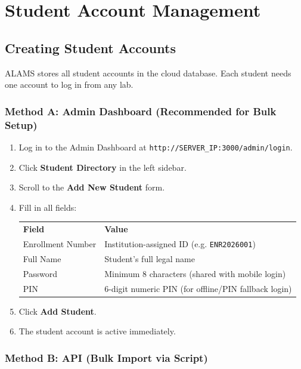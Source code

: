 \chapter{Student Account Management}
\label{ch:student-mgmt}

\section{Creating Student Accounts}

ALAMS stores all student accounts in the cloud database. Each student needs one account to log in from any lab.

\subsection{Method A: Admin Dashboard (Recommended for Bulk Setup)}

\begin{enumerate}[leftmargin=*, label=\textbf{Step \arabic*.}]
  \item Log in to the Admin Dashboard at \texttt{http://SERVER\_IP:3000/admin/login}.
  \item Click \textbf{Student Directory} in the left sidebar.
  \item Scroll to the \textbf{Add New Student} form.
  \item Fill in all fields:
    \begin{tcolorbox}[alamsbox, title={Student Registration Form Fields}]
    \begin{tabular}{ll}
    \textbf{Field} & \textbf{Value}\\
    Enrollment Number & Institution-assigned ID (e.g. \texttt{ENR2026001})\\
    Full Name & Student's full legal name\\
    Password & Minimum 8 characters (shared with mobile login)\\
    PIN & 6-digit numeric PIN (for offline/PIN fallback login)\\
    \end{tabular}
    \end{tcolorbox}
  \item Click \textbf{Add Student}.
  \item The student account is active immediately.
\end{enumerate}

\subsection{Method B: API (Bulk Import via Script)}

